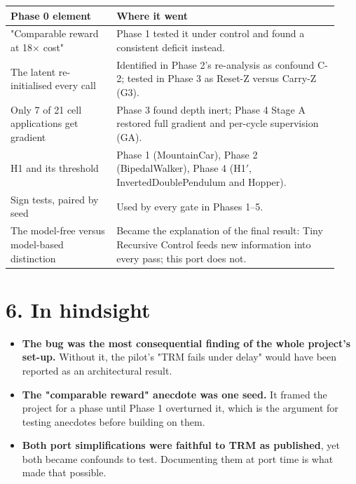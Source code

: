 \documentclass[11pt]{article}
\begin{document}
\begin{center}\small\begin{tabular}{>{\raggedright\arraybackslash}p{0.303\linewidth}>{\raggedright\arraybackslash}p{0.631\linewidth}}
\toprule
Phase 0 element & Where it went \\
\midrule
"Comparable reward at 18$\times$ cost" & Phase 1 tested it under control and found a consistent deficit instead. \\
The latent re-initialised every call & Identified in Phase 2's re-analysis as confound C-2; tested in Phase 3 as Reset-Z versus Carry-Z (G3). \\
Only 7 of 21 cell applications get gradient & Phase 3 found depth inert; Phase 4 Stage A restored full gradient and per-cycle supervision (GA). \\
H1 and its threshold & Phase 1 (MountainCar), Phase 2 (BipedalWalker), Phase 4 (H1$'$, InvertedDoublePendulum and Hopper). \\
Sign tests, paired by seed & Used by every gate in Phases 1--5. \\
The model-free versus model-based distinction & Became the explanation of the final result: Tiny Recursive Control feeds new information into every pass; this port does not. \\
\bottomrule
\end{tabular}\end{center}



\section*{6. In hindsight}



\begin{itemize}
\item \textbf{The bug was the most consequential finding of the whole project's set-up.} Without it, the pilot's "TRM fails under delay" would have been reported as an architectural result.
\item \textbf{The "comparable reward" anecdote was one seed.} It framed the project for a phase until Phase 1 overturned it, which is the argument for testing anecdotes before building on them.
\item \textbf{Both port simplifications were faithful to TRM as published}, yet both became confounds to test. Documenting them at port time is what made that possible.
\end{itemize}
\end{document}
